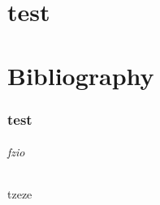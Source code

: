 \documentclass[a4paper, 10pt, english]{template}
\begin{document}


\begin{titlePage}
    \academicyear{} 

    \titlepageimage{}{}
    
    \addtitle{} 

    \begin{authors}{1}
    \end{authors}

\end{titlePage}
\newpage

\footerRight{}



\part{test}

\part{Bibliography}

\section{test}
\paragraph{fzio} tzeze

\printbibliography
\end{document}
